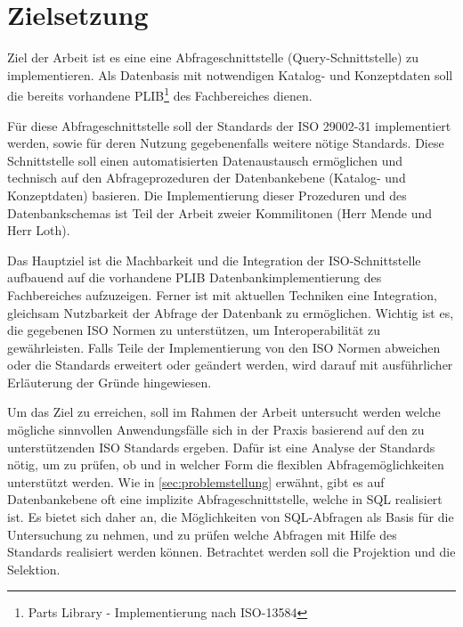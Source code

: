 \section{Zielsetzung}

Ziel der Arbeit ist es eine eine Abfrageschnittstelle (Query-Schnittstelle) zu implementieren. Als Datenbasis mit notwendigen Katalog- und Konzeptdaten soll die bereits vorhandene PLIB\footnote{Parts Library - Implementierung nach ISO-13584} des Fachbereiches dienen. 

Für diese Abfrageschnittstelle soll der Standards der ISO 29002-31 implementiert werden, sowie für deren Nutzung gegebenenfalls weitere nötige Standards. Diese Schnittstelle soll einen automatisierten Datenaustausch ermöglichen und technisch auf den Abfrageprozeduren der Datenbankebene (Katalog- und Konzeptdaten) basieren. Die Implementierung dieser Prozeduren und des Datenbankschemas ist Teil der Arbeit zweier Kommilitonen (Herr Mende und Herr Loth).
 
Das Hauptziel ist die Machbarkeit und die Integration der ISO-Schnittstelle aufbauend auf die vorhandene PLIB Datenbankimplementierung des Fachbereiches aufzuzeigen. 
Ferner ist mit aktuellen Techniken eine Integration, gleichsam Nutzbarkeit der Abfrage der Datenbank zu ermöglichen. Wichtig ist es, die gegebenen ISO Normen zu unterstützen, um Interoperabilität zu gewährleisten. Falls Teile der Implementierung von den ISO Normen abweichen oder die Standards erweitert oder geändert werden, wird darauf mit ausführlicher Erläuterung der Gründe hingewiesen. 

Um das Ziel zu erreichen, soll im Rahmen der Arbeit untersucht werden welche mögliche sinnvollen Anwendungsfälle sich in der Praxis basierend auf den zu unterstützenden ISO Standards ergeben. Dafür ist eine Analyse der Standards nötig, um zu prüfen, ob und in welcher Form die flexiblen Abfragemöglichkeiten unterstützt werden. Wie in \autoref{sec:problemstellung} erwähnt, gibt es auf Datenbankebene oft eine implizite Abfrageschnittstelle, welche in SQL realisiert ist. Es bietet sich daher an, die Möglichkeiten von SQL-Abfragen als Basis für die Untersuchung zu nehmen, und zu prüfen welche Abfragen mit Hilfe des Standards realisiert werden können. 
Betrachtet werden soll die Projektion und die Selektion.

